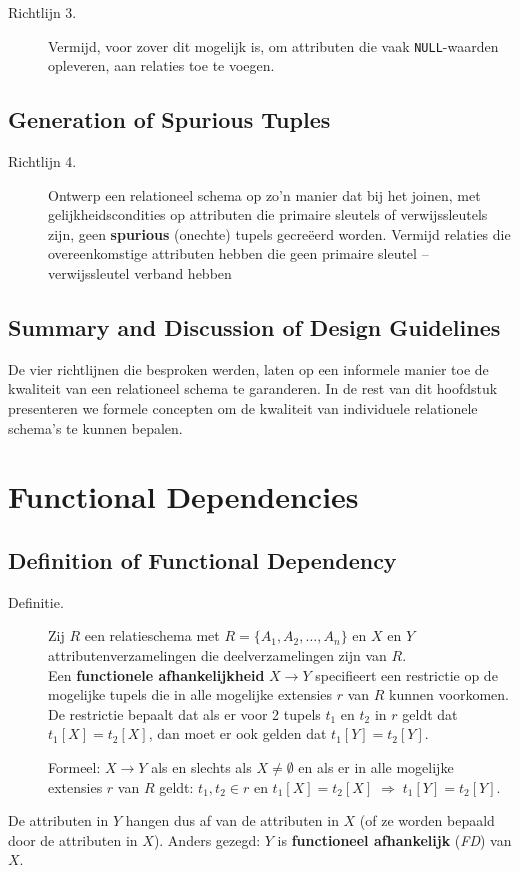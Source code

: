 \begin{description}
	\item[Richtlijn 3.] Vermijd, voor zover dit mogelijk is, om attributen die vaak \texttt{NULL}-waarden opleveren, aan relaties toe te voegen.
\end{description}


\subsection{Generation of Spurious Tuples}
\begin{description}
	\item[Richtlijn 4.] Ontwerp een relationeel schema op zo'n manier dat bij het joinen, met gelijkheidscondities op attributen die primaire sleutels of verwijssleutels zijn, geen \textbf{spurious} (onechte) tupels gecre\"eerd worden. Vermijd relaties die overeenkomstige attributen hebben die geen primaire sleutel -- verwijssleutel verband hebben
\end{description}


\subsection{Summary and Discussion of Design Guidelines}
De vier richtlijnen die besproken werden, laten op een informele manier toe de kwaliteit van een relationeel schema te garanderen. In de rest van dit hoofdstuk presenteren we formele concepten om de kwaliteit van individuele relationele schema's te kunnen bepalen.



\section{Functional Dependencies}
\subsection{Definition of Functional Dependency}
\begin{description}
	\item[Definitie.] Zij $R$ een relatieschema met $R = \{A_1, A_2, \dots, A_n\}$ en $X$ en $Y$ attributenverzamelingen die deelverzamelingen zijn van $R$.\\
	Een \textbf{functionele afhankelijkheid} $X \rightarrow Y$ specifieert een restrictie op de mogelijke tupels die in alle mogelijke extensies $r$ van $R$ kunnen voorkomen.\\
	De restrictie bepaalt dat als er voor 2 tupels $t_1$ en $t_2$ in $r$ geldt dat $t_1[X] = t_2[X]$, dan moet er ook gelden dat $t_1[Y] = t_2[Y]$.

	Formeel: $X \rightarrow Y$ als en slechts als $X \neq \emptyset$ en als er in alle mogelijke extensies $r$ van $R$ geldt: $t_1,t_2 \in r$ en $t_1[X] = t_2[X] \;\Longrightarrow\; t_1[Y] = t_2[Y]$.
\end{description}
De attributen in $Y$ hangen dus af van de attributen in $X$ (of ze worden bepaald door de attributen in $X$). Anders gezegd: $Y$ is \textbf{functioneel afhankelijk} (\textit{FD}) van $X$.

